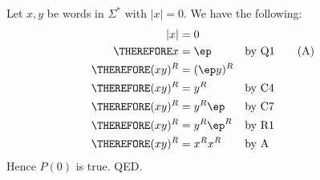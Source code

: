 Let $x, y$ be words in $\Sigma^*$ with $|x| = 0$.
We have the following:
\begin{align*}
              |x| &= 0                                \\
\THEREFORE      x &= \ep             & & \text{by Q1} \tag{A} \\
\THEREFORE (xy)^R &= (\ep y)^R         & &              \\
\THEREFORE (xy)^R &= y^R             & & \text{by C4}  \\
\THEREFORE (xy)^R &= y^R \ep   & & \text{by C7}  \\
\THEREFORE (xy)^R &= y^R \ep^R   & & \text{by R1}  \\
\THEREFORE (xy)^R &= x^R x^R   & & \text{by A} 
\end{align*}
Hence $P(0)$ is true.
QED.
\\


